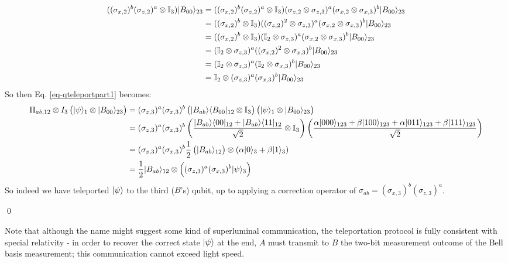 \begin{equation}
    \begin{split}
        ((\sigma_{x, 2})^b(\sigma_{z, 2})^a \otimes \mathbb{I}_3)\lvert B_{00} \rangle_{23} &= ((\sigma_{x, 2})^b(\sigma_{z, 2})^a \otimes \mathbb{I}_3)(\sigma_{z, 2} \otimes \sigma_{z, 3})^a(\sigma_{x, 2} \otimes \sigma_{x, 3})^b\lvert B_{00} \rangle_{23}
        \\ &= ((\sigma_{x, 2})^b\otimes \mathbb{I}_3)((\sigma_{z, 2})^2 \otimes \sigma_{z, 3})^a(\sigma_{x, 2} \otimes \sigma_{x, 3})^b\lvert B_{00} \rangle_{23}
        \\ &= ((\sigma_{x, 2})^b\otimes \mathbb{I}_3)(\mathbb{I}_2 \otimes \sigma_{z, 3})^a(\sigma_{x, 2} \otimes \sigma_{x, 3})^b\lvert B_{00} \rangle_{23}
        \\ &= (\mathbb{I}_2 \otimes \sigma_{z, 3})^a((\sigma_{x, 2})^2\otimes \sigma_{x, 3})^b\lvert B_{00} \rangle_{23}
        \\ &= (\mathbb{I}_2 \otimes \sigma_{z, 3})^a(\mathbb{I}_2 \otimes \sigma_{x, 3})^b\lvert B_{00} \rangle_{23}
        \\ &= \mathbb{I}_2 \otimes (\sigma_{z, 3})^a(\sigma_{x, 3})^b \lvert B_{00} \rangle_{23}
    \end{split}
\end{equation}
So then Eq. \eqref{eq-qteleportpart1} becomes:
\begin{equation}
    \begin{split}
        \Pi_{ab, 12} \otimes I_3\left(\lvert \psi \rangle_1 \otimes \lvert B_{00} \rangle_{23}\right) &= (\sigma_{z, 3})^a(\sigma_{x, 3})^b\left( \lvert B_{ab} \rangle \langle B_{00} \rvert_{12} \otimes \mathbb{I}_3\right) \left(\lvert \psi \rangle_1 \otimes \lvert B_{00} \rangle_{23}\right)
        \\ &= (\sigma_{z, 3})^a(\sigma_{x, 3})^b\left( \frac{\lvert B_{ab} \rangle \langle 00 \rvert_{12} + \lvert B_{ab} \rangle \langle 11 \rvert_{12}}{\sqrt{2}} \otimes \mathbb{I}_3\right) \left(\frac{\alpha\lvert 000 \rangle_{123} + \beta\lvert 100 \rangle_{123} + \alpha\lvert 011 \rangle_{123} + \beta\lvert 111 \rangle_{123}}{\sqrt{2}}\right)
        \\ &= (\sigma_{z, 3})^a(\sigma_{x, 3})^b\frac{1}{2}\left(\lvert B_{ab} \rangle_{12}\right) \otimes (\alpha\lvert 0 \rangle_3 + \beta\lvert 1 \rangle_3)
        \\ &= \frac{1}{2}\lvert B_{ab} \rangle_{12} \otimes \left((\sigma_{z, 3})^a(\sigma_{x, 3})^b\lvert \psi \rangle_3\right)
    \end{split}
\end{equation}
So indeed we have teleported $\lvert \psi \rangle$ to the third ($B$'s) qubit, up to applying a correction operator of $\sigma_{ab} = (\sigma_{x, 3})^b(\sigma_{z, 3})^a$. 

\qed

Note that although the name might suggest some kind of superluminal communication, the teleportation protocol is fully consistent with special relativity - in order to recover the correct state $\lvert \psi \rangle$ at the end, $A$ must transmit to $B$ the two-bit measurement outcome of the Bell basis measurement; this communication cannot exceed light speed.

